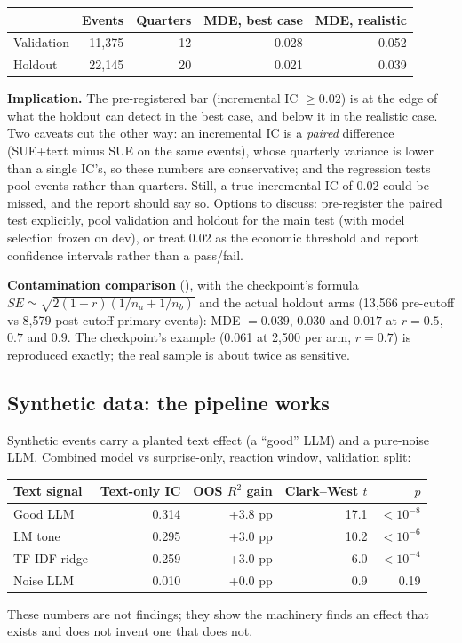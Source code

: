 \documentclass[11pt]{article}
\newcommand{\code}[1]{\path{#1}}
\begin{document}
\begin{center}
\begin{tabular}{@{}lrrrr@{}}
\toprule
& Events & Quarters & MDE, best case & MDE, realistic \\
\midrule
Validation & 11{,}375 & 12 & 0.028 & 0.052 \\
Holdout & 22{,}145 & 20 & 0.021 & 0.039 \\
\bottomrule
\end{tabular}
\end{center}
\noindent \textbf{Implication.} The pre-registered bar (incremental IC $\ge 0.02$) is at the edge of what
the holdout can detect in the best case, and below it in the realistic case. Two caveats cut the other
way: an incremental IC is a \emph{paired} difference (SUE+text minus SUE on the same events), whose
quarterly variance is lower than a single IC's, so these numbers are conservative; and the regression
tests pool events rather than quarters. Still, a true incremental IC of 0.02 could be missed, and the
report should say so. Options to discuss: pre-register the paired test explicitly, pool validation and
holdout for the main test (with model selection frozen on dev), or treat 0.02 as the economic
threshold and report confidence intervals rather than a pass/fail.

\textbf{Contamination comparison} (\code{cd_mde_contamination}), with the checkpoint's formula
$SE \simeq \sqrt{2(1-r)(1/n_a+1/n_b)}$ and the actual holdout arms (13{,}566 pre-cutoff vs 8{,}579
post-cutoff primary events): MDE $= 0.039$, $0.030$ and $0.017$ at $r = 0.5$, $0.7$ and $0.9$. The
checkpoint's example (0.061 at 2{,}500 per arm, $r=0.7$) is reproduced exactly; the real sample is
about twice as sensitive.

\subsection{Synthetic data: the pipeline works}

Synthetic events carry a planted text effect (a ``good'' LLM) and a pure-noise LLM. Combined model
vs surprise-only, reaction window, validation split:

\begin{center}
\begin{tabular}{@{}lrrrr@{}}
\toprule
Text signal & Text-only IC & OOS $R^2$ gain & Clark--West $t$ & $p$ \\
\midrule
Good LLM & 0.314 & +3.8 pp & 17.1 & $<10^{-8}$ \\
LM tone & 0.295 & +3.0 pp & 10.2 & $<10^{-6}$ \\
TF-IDF ridge & 0.259 & +3.0 pp & 6.0 & $<10^{-4}$ \\
Noise LLM & 0.010 & +0.0 pp & 0.9 & 0.19 \\
\bottomrule
\end{tabular}
\end{center}
\noindent These numbers are not findings; they show the machinery finds an effect that exists and
does not invent one that does not.
\end{document}
